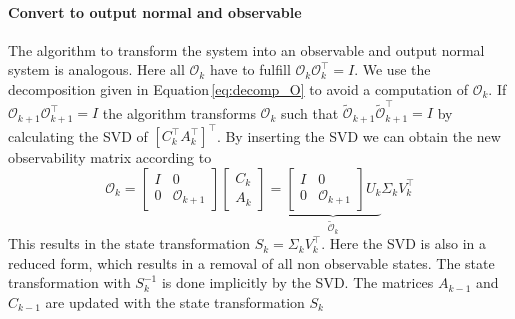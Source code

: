 \documentclass[doctype=mastersthesis,BCOR=15mm,biblatex]{ldvbook}%
\newcommand{\Ob}{\mathcal{O}} %
\newcommand{\eye}{I} %
\begin{document}
\paragraph{Convert to output normal and observable}
The algorithm to transform the system into an observable and output normal system is analogous.
Here all $\Ob_k$ have to fulfill $\Ob_{k} \Ob_{k}^\top=\eye$.
We use the decomposition given in Equation\,\ref{eq:decomp_O} to avoid a computation of $\Ob_k$.
If $\Ob_{k+1} \Ob_{k+1}^\top=\eye$ the algorithm transforms $\Ob_{k}$ such that $\tilde{\Ob}_{k+1} \tilde{\Ob}_{k+1}^\top=\eye$  by calculating the SVD of $[C_k^\top A_k^\top]^\top$.
By inserting the SVD we can obtain the new observability matrix according to
\begin{equation}
	\Ob_{k}
	=
	\begin{bmatrix}
	\eye& 0 \\
	0& \Ob_{k+1}
	\end{bmatrix}
	\begin{bmatrix}
	C_k\\
	A_k
	\end{bmatrix}
	=
	\underbrace{
	\begin{bmatrix}
	\eye& 0 \\
	0& \Ob_{k+1}
	\end{bmatrix}
	U_k}_{\tilde{\Ob}_k}
	\Sigma_k V_k^\top
\end{equation}
This results in the state transformation $S_k = \Sigma_k V_k^\top$.
Here the SVD is also in a reduced form, which results in a removal of all non observable states.
The state transformation with $S_k^{-1}$ is done implicitly by the SVD.
The matrices $A_{k-1}$ and $C_{k-1}$ are updated with the state transformation $S_k$
\end{document}
